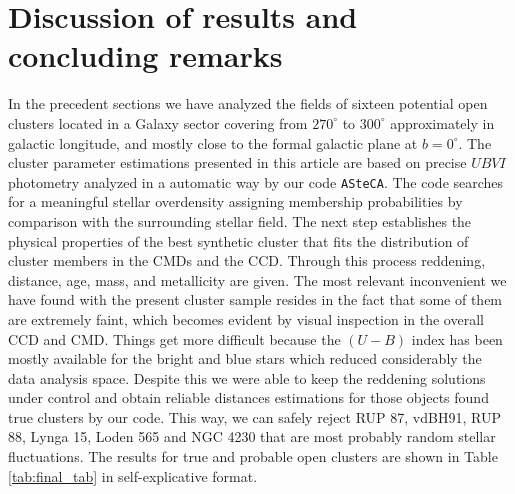 \documentclass[draft]{aa}
\begin{document}
\section{Discussion of results and concluding remarks}
\label{sec:results_concl}

In the precedent sections we have analyzed the fields of sixteen potential
open clusters located in a Galaxy sector covering from $270^\circ$ to
$300^\circ$ approximately in galactic longitude, and mostly close to the formal
galactic plane at $b=0^\circ$.
The cluster parameter estimations presented in this article are based on
precise $UBVI$ photometry analyzed in a automatic way by our code 
\texttt{ASteCA}. The code searches for a meaningful stellar overdensity
assigning membership probabilities by comparison with the surrounding stellar
field.
The next step establishes the physical properties of the best synthetic cluster
that fits the distribution of cluster members in the CMDs and the CCD.
Through this process reddening, distance, age, mass, and metallicity are
given.
The most relevant inconvenient we have found with the present cluster
sample resides in the fact that some of them are extremely faint, which
becomes evident by visual inspection in the overall CCD and CMD.
Things get more difficult because the $(U-B)$ index has been mostly available
for the bright and blue stars which reduced considerably the data analysis
space. Despite this we were able to keep the reddening solutions under control
and obtain reliable distances estimations for those objects found true clusters
by our code. This way, we can safely reject RUP 87, vdBH91, RUP 88, Lynga 15,
Loden 565 and NGC 4230 that are most probably random stellar fluctuations. The
results for true and probable open clusters are shown in Table 
\ref{tab:final_tab} in self-explicative format.
\end{document}
